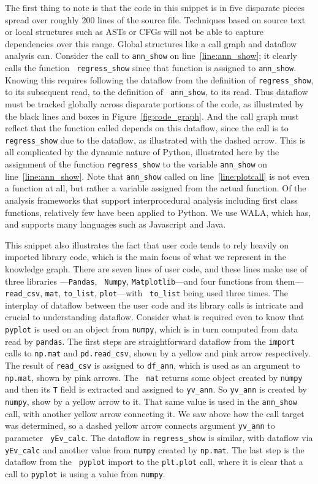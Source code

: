  The first thing to note is that the code in this snippet is in five
disparate pieces spread over roughly 200 lines of the source file.  Techniques
based on source text or local structures such as ASTs or CFGs will not
be able to capture dependencies over this range.  Global structures like a
call graph and dataflow analysis can.  Consider the call to {\tt ann\_show} on
line~\ref{line:ann_show}; it clearly calls the function {\tt
regress\_show} since that function is assigned to {\tt ann\_show}.
Knowing this requires following the dataflow from the definition of
{\tt regress\_show}, to its subsequent read, to the definition of {\tt
ann\_show}, to its read.  Thus dataflow must be tracked globally
across disparate portions of the code, as illustrated by the black
lines and boxes in Figure~\ref{fig:code_graph}.  And the call graph
must reflect that the function called depends on this dataflow, since
the call is to {\tt regress\_show} due to the dataflow, as illustrated
with the dashed arrow.  This is all complicated by the dynamic
nature of Python, illustrated here by the assignment of the function
{\tt regress\_show} to the variable {\tt ann\_show} on
line~\ref{line:ann_show}.  Note that {\tt ann\_show} called on
line~\ref{line:plotcall} is not even a function at all, but rather a variable
assigned from the actual function.  Of the analysis frameworks that
support interprocedural analysis including first class functions,
relatively few have been applied to Python.  We use WALA, which has, and supports many languages such as Javascript and Java.

This snippet also illustrates the fact that user code tends to rely
heavily on imported library code, which is the main focus of what we
represent in the knowledge graph.  There are seven lines of user code,
and these lines make use of three libraries ---{\tt Pandas}, {\tt
Numpy}, {\tt Matplotlib}---and four functions from them---{\tt
read\_csv}, {\tt mat}, {\tt to\_list}, {\tt plot}---with {\tt
to\_list} being used three times.  The interplay of dataflow between
the user code and its library calls is intricate and crucial to
understanding dataflow.  Consider what is required even to know that
{\tt pyplot} is used on an object from {\tt numpy}, which is in turn
computed from data read by {\tt pandas}.  The first steps are
straightforward dataflow from the {\tt import} calls to {\tt np.mat}
and {\tt pd.read\_csv}, shown by a yellow and pink arrow respectively.
The result of {\tt read\_csv} is assigned to {\tt df\_ann}, which is
used as an argument to {\tt np.mat}, shown by pink arrows.  The {\tt
mat} returns some object created by {\tt numpy} and then its {\tt T}
field is extracted and assigned to {\tt yv\_ann}.  So {\tt yv\_ann} is
created by {\tt numpy}, show by a yellow arrow to it.  That same value
is used in the {\tt ann\_show} call, with another yellow arrow
connecting it.  We saw above how the call target was determined, so a
dashed yellow arrow connects argument {\tt yv\_ann} to parameter {\tt
yEv\_calc}.  The dataflow in {\tt regress\_show} is similar, with
dataflow via {\tt yEv\_calc} and another value from {\tt numpy}
created by {\tt np.mat}.  The last step is the dataflow from the {\tt
pyplot} import to the {\tt plt.plot} call, where it is clear that a
call to {\tt pyplot} is using a value from {\tt numpy}.

